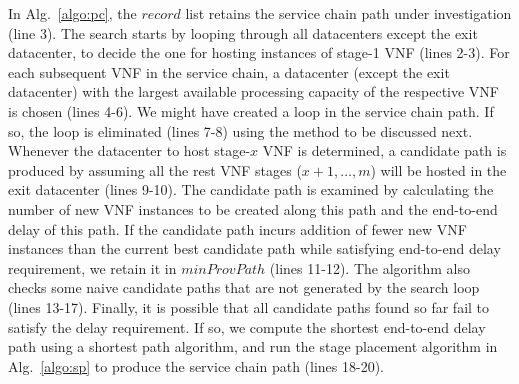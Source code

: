 In Alg.~\ref{algo:pc}, the $record$ list retains the service chain path under investigation (line 3). The search starts by looping through all datacenters except the exit datacenter, to decide the one for hosting instances of stage-1 VNF %
(lines 2-3). For each subsequent VNF in the service chain, a datacenter (except the exit datacenter) with the largest available processing capacity of the respective VNF is chosen (lines 4-6). We might have created a loop in the service chain path. %
 If so, the loop is eliminated (lines 7-8) using the method to be discussed next. %
 Whenever the datacenter to host stage-$x$ VNF is determined, a candidate path is produced by assuming all the rest VNF stages ($x+1,\ldots, m$) will be hosted in the exit datacenter (lines 9-10). The candidate path is examined by calculating the number of new VNF instances to be created along this path and the end-to-end delay of this path. If the candidate path incurs addition of fewer new VNF instances than the current best candidate path while satisfying end-to-end delay requirement, we retain it in $minProvPath$ (lines 11-12). The algorithm also checks some naive candidate paths that are not generated by the search loop (lines 13-17). Finally, it is possible that all candidate paths found so far fail to satisfy the delay requirement. If so, we compute the shortest end-to-end delay path using a shortest path algorithm, and run the stage placement algorithm in Alg.~\ref{algo:sp}  %
  to produce the service chain path (lines 18-20).

\begin{comment}
	Suppose that Alg.~\ref{algo:pc} is finding a service chain path for entry-exit datacenter pair $(1, 5)$ and the DP service chain consists of $3$ stages. During the execution of the algorithm, the {\em record} list contains $(1, 2, 4, tbd, 5)$. It means the algorithm has determined that instances of stage $1$ VNF should be placed on datacenter $2$ and instances of stage $2$ VNF should be placed on datacenter $4$. And the algorithm is going to find out a datacenter for hosting instances of stage $3$ VNF. If datacenter $2$ is selected to host the stage-$3$ VNF, then the {\em record} becomes $(1, 2, 4, 2, 5)$ and a loop is created between datacenters $2$ and $4$.
\end{comment}

